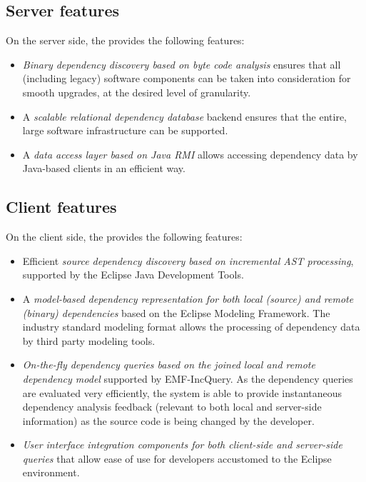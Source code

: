 \subsection{Server features}
On the server side, the \ptool{} provides the following features:
\begin{itemize}
  \item \emph{Binary dependency discovery based on byte code analysis} ensures
  that all (including legacy) software components can be taken into
  consideration for smooth upgrades, at the desired level of granularity.
  \item A \emph{scalable relational dependency database} backend ensures that
  the entire, large software infrastructure can be supported.
  \item A \emph{data access layer based on Java RMI} allows accessing dependency
  data by Java-based clients in an efficient way.
\end{itemize}

\subsection{Client features}
On the client side, the \ptool{} provides the following features:
\begin{itemize}
  \item Efficient \emph{source dependency discovery based on incremental AST
  processing}, supported by the Eclipse Java Development Tools.
  \item A \emph{model-based dependency representation for both local (source)
  and remote (binary) dependencies} based on the Eclipse Modeling Framework. The
  industry standard modeling format allows the processing of dependency data by
  third party modeling tools.
  \item \emph{On-the-fly dependency queries based on the joined local and remote
  dependency model} supported by EMF-IncQuery. As the dependency queries are
  evaluated very efficiently, the system is able to provide instantaneous
  dependency analysis feedback (relevant to both local and server-side
  information) as the source code is being changed by the developer.
  \item \emph{User interface integration components for both client-side and
  server-side queries} that allow ease of use for developers accustomed to the
  Eclipse environment.
\end{itemize}

